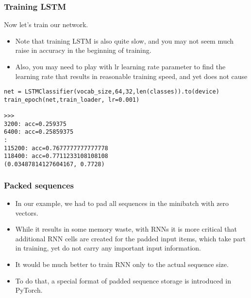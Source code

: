 \begin{frame}[fragile] \frametitle{Training LSTM}

Now let's train our network. 

\begin{itemize}
\item Note that training LSTM is also quite slow, and you may not seem much raise in accuracy in the beginning of training. 
\item Also, you may need to play with lr learning rate parameter to find the learning rate that results in reasonable training speed, and yet does not cause

\end{itemize}

\begin{lstlisting}
net = LSTMClassifier(vocab_size,64,32,len(classes)).to(device)
train_epoch(net,train_loader, lr=0.001)

>>>
3200: acc=0.259375
6400: acc=0.25859375
:
115200: acc=0.7677777777777778
118400: acc=0.7711233108108108
(0.03487814127604167, 0.7728)
\end{lstlisting}

\end{frame}

\begin{frame}[fragile] \frametitle{Packed sequences}

\begin{itemize}
\item In our example, we had to pad all sequences in the minibatch with zero vectors. 
\item While it results in some memory waste, with RNNs it is more critical that additional RNN cells are created for the padded input items, which take part in training, yet do not carry any important input information. 
\item It would be much better to train RNN only to the actual sequence size.
\item To do that, a special format of padded sequence storage is introduced in PyTorch. 
\end{itemize}



\end{frame}


